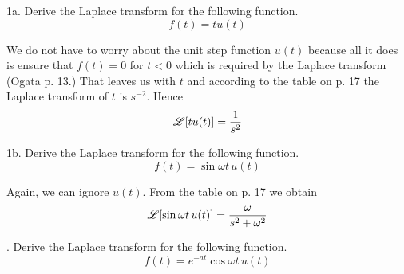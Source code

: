\documentclass[11pt]{report}
\begin{document}
\noindent
1a. Derive the Laplace transform for the following function.
$$f(t)=tu(t)$$

\bigskip
\noindent
We do not have to worry about the unit step function $u(t)$ because all
it does is ensure that $f(t) = 0$ for $t<0$ which is required by the
Laplace transform
(Ogata p. 13.)
That leaves us with $t$ and according to the table on p. 17
the Laplace transform of $t$ is $s^{-2}$.
Hence
$${\mathscr L}[tu(t)]={1\over s^2}$$

\bigskip
\noindent
1b. Derive the Laplace transform for the following function.
$$f(t)=\sin\omega t\,u(t)$$

\bigskip
\noindent
Again, we can ignore $u(t)$.
From the table on p. 17 we obtain
$${\mathscr L}[\sin\omega t\,u(t)]={\omega\over s^2+\omega^2}$$

\bigskip
{}. Derive the Laplace transform for the following function.
$$f(t)=e^{-at}\cos\omega t\,u(t)$$
\end{document}
